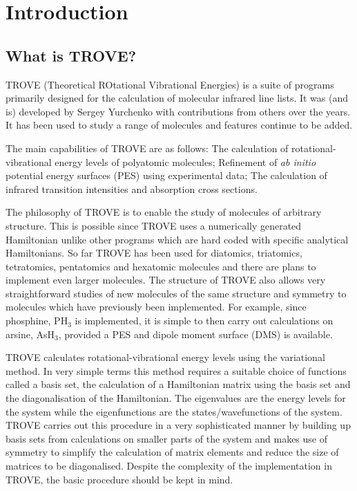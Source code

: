 
\chapter{Introduction}
\label{sec:intro}

\section{What is TROVE?}
\label{sec:whatsTrove}
TROVE (Theoretical ROtational Vibrational Energies) is a suite of programs primarily designed for the 
calculation of molecular infrared line lists\cite{TROVE}.
It was (and is) developed by Sergey Yurchenko with contributions from others over the years. 
It has been used to study a range of molecules and features continue to be added. 

The main capabilities of TROVE are as follows: The calculation of rotational-vibrational energy levels of polyatomic molecules; 
Refinement of \textit{ab initio} potential energy surfaces (PES) using experimental data;
The calculation of infrared transition intensities and absorption cross sections. 

The philosophy of TROVE is to enable the study of molecules of arbitrary structure. 
This is possible since TROVE uses a numerically generated Hamiltonian unlike other programs which are hard coded with 
specific analytical Hamiltonians. 
So far TROVE has been used for diatomics,\cite{TROVE} triatomics,\cite{TROVE} tetratomics,
\cite{jt466,jt500,jt554,jt553,jt556,jt597,jt592}
pentatomics\cite{jt564,jt612,jt701} and hexatomic molecules\cite{jt729}
and there are plans to implement even larger molecules. 
The structure of TROVE also allows very straightforward studies of new molecules of the same structure and symmetry to
molecules which have previously been implemented. For example, since phosphine, PH$_3$ is implemented, it is simple to then
carry out calculations on arsine, AsH$_3$, provided a PES and dipole moment surface (DMS) is available. 

TROVE calculates rotational-vibrational energy levels using the variational method.\cite{11Atkins.book}
In very simple terms this method requires a suitable choice of functions called a basis set, 
the calculation of a Hamiltonian matrix using the basis set and the diagonalisation of the Hamiltonian. 
The eigenvalues are the energy levels for the system while the eigenfunctions are the states/wavefunctions of the system. 
TROVE carries out this procedure in a very sophisticated manner by building up basis sets from calculations on smaller 
parts of the system and makes use of symmetry to simplify the calculation of matrix elements and reduce the size of 
matrices to be diagonalised. Despite the complexity of the implementation in TROVE, the basic procedure should be 
kept in mind.  

